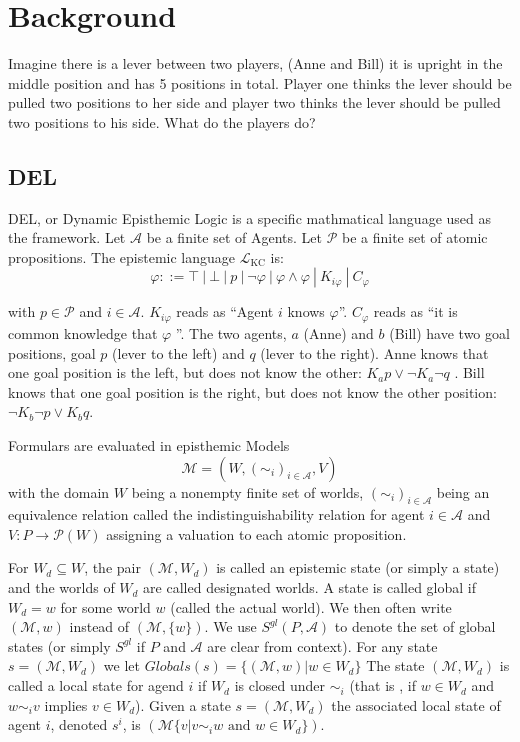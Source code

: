 \chapter{Background}\label{chap:background}

Imagine there is a lever between two players, (Anne and Bill) it is upright in the middle position and has 5 positions in total. Player one thinks the lever should be pulled two positions to her side and player two thinks the lever should be pulled two positions to his side. What do the players do? 

\section{DEL}
DEL, or Dynamic Episthemic Logic is a specific mathmatical language used as the framework.
Let $\mathcal{A}$ be a finite set of Agents. Let $\mathcal{P}$ be a finite set of atomic propositions.
The epistemic language $\mathcal{L}_{\text{KC}}$ is: \\
$$
\varphi ::= \top \ | \ \bot \ | \ p \ | \ \neg \varphi \ | \ \varphi \wedge \varphi \ | \ K_{i\varphi} \ | \ C_\varphi
$$

with $p \in \mathcal{P}$ and $i \in \mathcal{A}$.
$K_{i\varphi}$ reads as ``Agent $i$ knows $\varphi$''. $C_\varphi$ reads as ``it is common knowledge that $\varphi$ ''.
 The two agents, $a$ (Anne) and $b$ (Bill) have two goal positions, goal $p$ (lever to the left) and $q$ (lever to the right). Anne knows that one goal position is the left, but does not know the other: $K_a p \vee \neg K_a \neg q$ . Bill knows that one goal position is the right, but does not know the other position: $\neg K_b \neg p \vee K_b q$.


Formulars are evaluated in episthemic Models
$$
\mathcal{M}=(W, (\sim_i)_{i \in \mathcal{A}}, V)
$$
with the domain $W$ being a nonempty finite set of worlds, $(\sim_i)_{i \in \mathcal{A}}$ being an equivalence relation called the indistinguishability relation for agent $i \in \mathcal{A}$ and $V : P \rightarrow \mathcal{P}(W)$ assigning a valuation to each atomic proposition.

For $W_d \subseteq W$, the pair $(\mathcal{M}, W_d)$ is called an epistemic state (or simply a state) and the worlds of $W_d$ are called designated worlds. A state is called global if $W_d={w}$ for some world $w$ (called the actual world). We then often write $(\mathcal{M},w)$ instead of $(\mathcal{M},\{w\} )$. We use $S^{gl}(P,\mathcal{A})$ to denote the set of global states (or simply $S^{gl}$ if $P$ and $\mathcal{A}$ are clear from context). For any state $ s=(\mathcal{M}, W_d) $ we let $Globals(s)= \{ (\mathcal{M},w) | w \in W_d \} $
The state $(\mathcal{M}, W_d)$ is called a local state for agend $i$ if $W_d$ is closed under $\sim _i$ (that is , if $w \in W_d$ and $w \sim _i v $ implies $v \in W_d$).
Given a state $s=(\mathcal{M}, W_d)$ the associated local state of agent $i$, denoted $s^i$, is $(\mathcal{M}\{v|v\sim _i w \text{ and } w \in W_d\})$.

